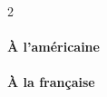 \documentclass[varwidth, border = 10pt]{standalone}
\begin{document}
\begin{multicols}{2}
    \paragraph{À l'américaine}
    \leavevmode

    \example{(}{)}

    \paragraph{À la française}
    \leavevmode


    \example{]}{[}
\end{multicols}
\end{document}
